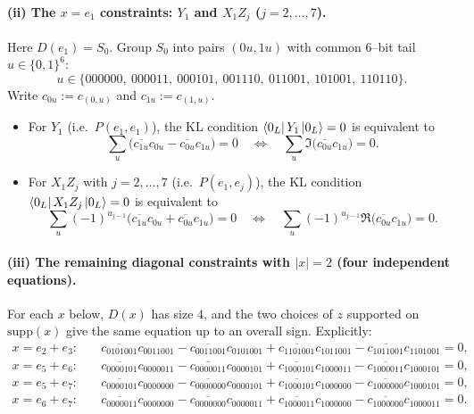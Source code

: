 \documentclass[11pt]{article}
\newcommand{\supp}{\mathrm{supp}}
\begin{document}
\paragraph{(ii) The $x=e_1$ constraints: $Y_1$ and $X_1Z_j$ ($j=2,\dots,7$).}
Here $D(e_1)=S_0$. Group $S_0$ into pairs $(0u,1u)$ with common $6$--bit tail $u\in\{0,1\}^6$:
\[
u\in\{000000,\ 000011,\ 000101,\ 001110,\ 011001,\ 101001,\ 110110\}.
\]
Write $c_{0u}:=c_{(0,u)}$ and $c_{1u}:=c_{(1,u)}$.

\begin{itemize}
\item For $Y_1$ (i.e.\ $P(e_1,e_1)$), the KL condition $\bra{0_L}Y_1\ket{0_L}=0$ is equivalent to
\begin{equation}
\sum_u\Big(\overline{c_{1u}}c_{0u}-\overline{c_{0u}}c_{1u}\Big)=0
\quad\Longleftrightarrow\quad
\sum_u \Im\!\big(\overline{c_{0u}}c_{1u}\big)=0.
\label{eq:Y1}
\end{equation}

\item For $X_1Z_j$ with $j=2,\dots,7$ (i.e.\ $P(e_1,e_j)$), the KL condition $\bra{0_L}X_1Z_j\ket{0_L}=0$ is equivalent to
\begin{equation}
\sum_u (-1)^{u_{j-1}}\Big(\overline{c_{1u}}c_{0u}+\overline{c_{0u}}c_{1u}\Big)=0
\quad\Longleftrightarrow\quad
\sum_u (-1)^{u_{j-1}}\Re\!\big(\overline{c_{0u}}c_{1u}\big)=0.
\label{eq:X1Zj}
\end{equation}
\end{itemize}

\paragraph{(iii) The remaining diagonal constraints with $|x|=2$ (four independent equations).}
For each $x$ below, $D(x)$ has size $4$, and the two choices of $z$ supported on $\supp(x)$ give the same equation up to an overall sign.
Explicitly:
\begin{align}
x=e_2+e_3:\quad&
\overline{c_{0101001}}c_{0011001}-\overline{c_{0011001}}c_{0101001}
+\overline{c_{1101001}}c_{1011001}-\overline{c_{1011001}}c_{1101001}=0,
\label{eq:diag-e2e3}\\[2mm]
x=e_5+e_6:\quad&
\overline{c_{0000101}}c_{0000011}-\overline{c_{0000011}}c_{0000101}
+\overline{c_{1000101}}c_{1000011}-\overline{c_{1000011}}c_{1000101}=0,
\label{eq:diag-e5e6}\\[2mm]
x=e_5+e_7:\quad&
\overline{c_{0000101}}c_{0000000}-\overline{c_{0000000}}c_{0000101}
+\overline{c_{1000101}}c_{1000000}-\overline{c_{1000000}}c_{1000101}=0,
\label{eq:diag-e5e7}\\[2mm]
x=e_6+e_7:\quad&
\overline{c_{0000011}}c_{0000000}-\overline{c_{0000000}}c_{0000011}
+\overline{c_{1000011}}c_{1000000}-\overline{c_{1000000}}c_{1000011}=0.
\label{eq:diag-e6e7}
\end{align}
\end{document}

